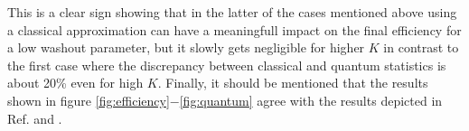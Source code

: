 This is a clear sign showing that in the latter of the cases mentioned above using a classical approximation can have a meaningfull impact on the final efficiency for a low washout parameter, but it slowly gets negligible for higher $K$ in contrast to the first case where the discrepancy between classical and quantum statistics is about 20\% even for high $K$.\newline\indent
Finally, it should be mentioned that the results shown in figure \ref{fig:efficiency}$-$\ref{fig:quantum} agree with the results depicted in Ref. \cite{Bodeker:2013qaa} and \cite{Wormann:2016yyi}.\newpage